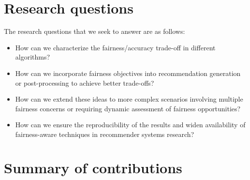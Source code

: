 

\section{Research questions}

The research questions that we seek to answer are as follows:

\begin{itemize}
    \item How can we characterize the fairness/accuracy trade-off in different algorithms?
    \item How can we incorporate fairness objectives into recommendation generation or post-processing to achieve better trade-offs? %
    \item How can we extend these ideas to more complex scenarios involving multiple fairness concerns or requiring dynamic assessment of fairness opportunities? %
    \item How can we ensure the reproducibility of the results and widen availability of fairness-aware techniques in recommender systems research? %
\end{itemize}

\section{Summary of contributions}


